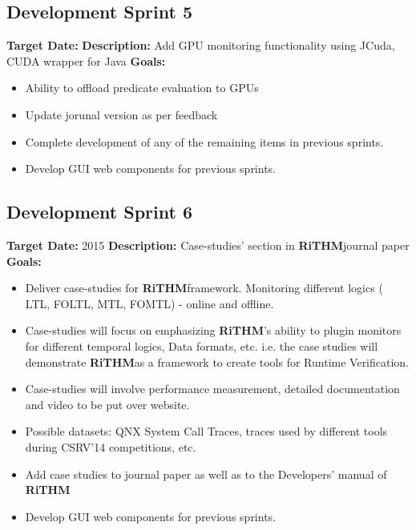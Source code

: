 \documentclass[]{article}
\newcommand{\rithm}{\textbf{RiTHM}\space}
\begin{document}
\subsection{Development Sprint 5}
\textbf{Target Date:}\space {}\newline
\textbf{Description:} Add GPU monitoring functionality using JCuda, CUDA wrapper for Java \newline
\textbf{Goals:}
\begin{itemize}
	\item
	Ability to offload predicate evaluation to GPUs
	\item
	Update jorunal version as per feedback
	\item
	Complete development of any of the remaining items in previous sprints.
	\item
	Develop GUI web components for previous sprints. 
\end{itemize}

\subsection{Development Sprint 6}
\textbf{Target Date:}\space {} {2015}\newline
\textbf{Description:} Case-studies' section in \rithm journal paper \newline
\textbf{Goals:}
\begin{itemize}
	\item
	Deliver case-studies for \rithm framework. Monitoring different logics ( LTL, FOLTL, MTL, FOMTL) - online and offline.
	\item
	Case-studies will focus on emphasizing \rithm's ability to plugin monitors for different temporal logics, Data formats, etc. i.e. the case studies will demonstrate \rithm as a framework to create tools for Runtime Verification.
	\item
	Case-studies will involve performance measurement, detailed documentation and video to be put over website.
	\item
	Possible datasets: QNX System Call Traces, traces used by different tools during CSRV'14 competitions, etc.
	\item
	Add case studies to journal paper as well as to the Developers' manual of \rithm
	\item
	Develop GUI web components for previous sprints. 
\end{itemize}
\end{document}
